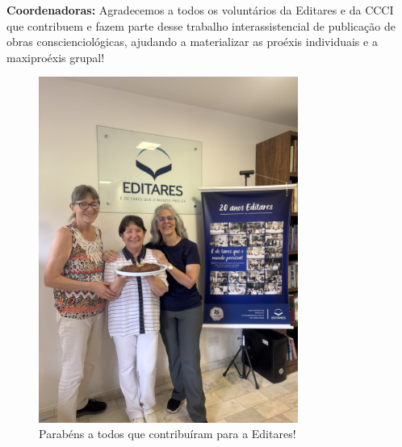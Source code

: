 \documentclass{gescons}
\begin{document}
\begin{multicols}{2}

\textbf{Coordenadoras:} Agradecemos a todos os voluntários da Editares e da CCCI que contribuem e fazem parte desse trabalho interassistencial de publicação de obras conscienciológicas, ajudando a materializar as proéxis individuais e a maxiproéxis grupal!






        
    \end{multicols}

\begin{center}
    
    
\end{center}


\begin{figure}[h] %
\centering %
\includegraphics[width=8.5cm,trim={0 0 0 60},clip]{articles/resumo/fotos/gestao/IMG_1282.JPEG}
\caption*{Parabéns a todos que contribuíram para a Editares!} %
\end{figure}
\end{document}
